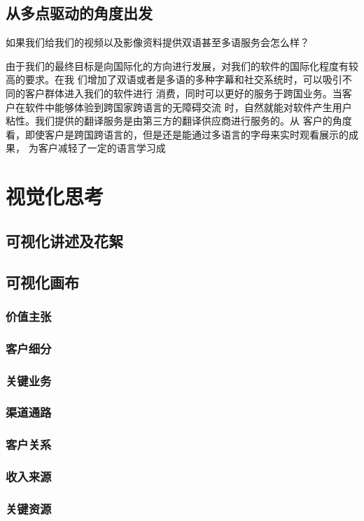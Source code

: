 \documentclass[a4paper,12pt]{article}
\begin{document}
    \subsection{从多点驱动的角度出发}
    如果我们给我们的视频以及影像资料提供双语甚至多语服务会怎么样？

    由于我们的最终目标是向国际化的方向进行发展，对我们的软件的国际化程度有较高的要求。在我 们增加了双语或者是多语的多种字幕和社交系统时，可以吸引不同的客户群体进入我们的软件进行 消费，同时可以更好的服务于跨国业务。当客户在软件中能够体验到跨国家跨语言的无障碍交流 时，自然就能对软件产生用户粘性。我们提供的翻译服务是由第三方的翻译供应商进行服务的。从 客户的角度看，即使客户是跨国跨语言的，但是还是能通过多语言的字母来实时观看展示的成果， 为客户减轻了一定的语言学习成
    \section{视觉化思考}
    \subsection{可视化讲述及花絮}
    \subsection{可视化画布}
    \subsubsection{价值主张}
    \subsubsection{客户细分}
    \subsubsection{关键业务}
    \subsubsection{渠道通路}
    \subsubsection{客户关系}
    \subsubsection{收入来源}
    \subsubsection{关键资源}
\end{document}
